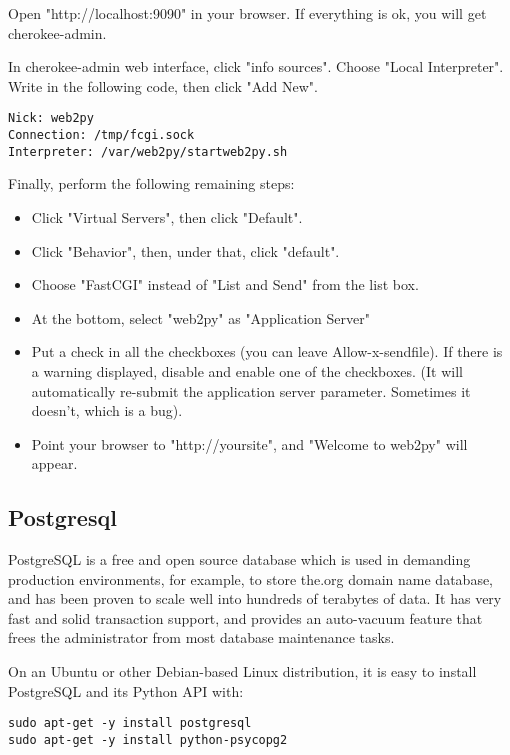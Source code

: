 \documentclass[justified,sixbynine,notoc]{tufte-book}
\begin{document}
\begin{fullwidth}
Open "http://localhost:9090" in your browser.  If everything is ok, you will get cherokee-admin.

In cherokee-admin web interface, click "info sources".  Choose "Local Interpreter". Write in the following code, then click "Add New".

\begin{lstlisting}
Nick: web2py
Connection: /tmp/fcgi.sock
Interpreter: /var/web2py/startweb2py.sh
\end{lstlisting}

Finally, perform the following remaining steps:
\begin{itemize}
\item Click "Virtual Servers", then click "Default".

\item Click "Behavior", then, under that, click "default".

\item Choose "FastCGI" instead of "List and Send" from the list box.

\item At the bottom, select "web2py" as "Application Server"

\item Put a check in all the checkboxes (you can leave Allow-x-sendfile). If there is a warning displayed, disable and enable one of the checkboxes. (It will automatically re-submit the application server parameter. Sometimes it doesn't, which is a bug).

\item Point your browser to "http://yoursite", and "Welcome to web2py" will appear.
\end{itemize}

\goodbreak\subsection{Postgresql}

PostgreSQL is a free and open source database which is used in demanding production environments, for example, to store the.org domain name database, and has been proven to scale well into hundreds of terabytes of data. It has very fast and solid transaction support, and provides an auto-vacuum feature that frees the administrator from most database maintenance tasks.

On an Ubuntu or other Debian-based Linux distribution, it is easy to install PostgreSQL and its Python API with:
\begin{lstlisting}
sudo apt-get -y install postgresql
sudo apt-get -y install python-psycopg2
\end{lstlisting}


\end{fullwidth}
\end{document}
